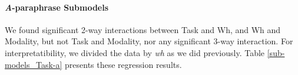 \documentclass[12pt,letterpaper,table,svgnames,dvipsnames]{article}
\begin{document}

\paragraph{\emph{A}-paraphrase Submodels}

We found significant 2-way interactions between Task and Wh, and Wh and Modality, but not Task and Modality, nor any significant 3-way interaction. For interpretatibility, we divided the data by \emph{wh} as we did previously. Table \ref{sub-models_Task-a} presents these regression results.
\end{document}
